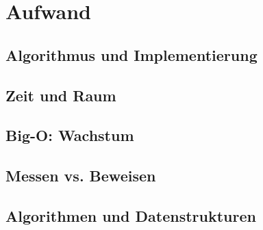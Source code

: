 \chapter{Aufwand}
\section{Algorithmus und Implementierung}
\section{Zeit und Raum}
\section{Big-O: Wachstum}
\section{Messen vs. Beweisen}\label{messenVsBeweisen}
\section{Algorithmen und Datenstrukturen}
